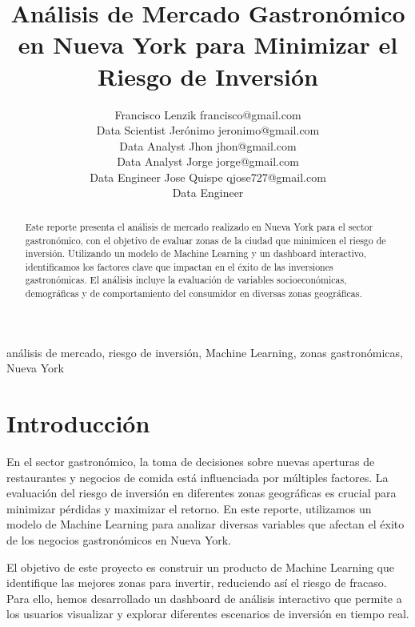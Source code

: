 \documentclass[twoside,11pt]{article}
\begin{document}
\title{Análisis de Mercado Gastronómico en Nueva York para Minimizar el Riesgo de Inversión}

\author{
\name Francisco Lenzik \email francisco@gmail.com \\
\addr Data Scientist
\AND
\name Jerónimo \email jeronimo@gmail.com \\
\addr Data Analyst
\AND
\name Jhon \email jhon@gmail.com \\
\addr Data Analyst
\AND
\name Jorge \email jorge@gmail.com \\
\addr Data Engineer
\AND
\name Jose Quispe \email qjose727@gmail.com \\
\addr Data Engineer
}
\editor{}

\maketitle

\begin{abstract}%
Este reporte presenta el análisis de mercado realizado en Nueva York para el sector gastronómico, con el objetivo de evaluar zonas de la ciudad que minimicen el riesgo de inversión. Utilizando un modelo de Machine Learning y un dashboard interactivo, identificamos los factores clave que impactan en el éxito de las inversiones gastronómicas. El análisis incluye la evaluación de variables socioeconómicas, demográficas y de comportamiento del consumidor en diversas zonas geográficas.
\end{abstract}

\begin{keywords}
  análisis de mercado, riesgo de inversión, Machine Learning, zonas gastronómicas, Nueva York
\end{keywords}

\section{Introducción}

En el sector gastronómico, la toma de decisiones sobre nuevas aperturas de restaurantes y negocios de comida está influenciada por múltiples factores. La evaluación del riesgo de inversión en diferentes zonas geográficas es crucial para minimizar pérdidas y maximizar el retorno. En este reporte, utilizamos un modelo de Machine Learning para analizar diversas variables que afectan el éxito de los negocios gastronómicos en Nueva York.

El objetivo de este proyecto es construir un producto de Machine Learning que identifique las mejores zonas para invertir, reduciendo así el riesgo de fracaso. Para ello, hemos desarrollado un dashboard de análisis interactivo que permite a los usuarios visualizar y explorar diferentes escenarios de inversión en tiempo real.
\end{document}

